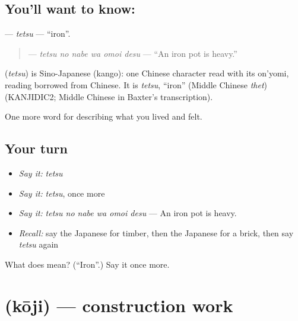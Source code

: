 \subsection*{You'll want to know: }
\textbf{} — \emph{tetsu} — \textquotedblleft{}iron\textquotedblright{}.

\begin{quote}
\textbf{  } — \emph{tetsu no nabe wa omoi desu} — \textquotedblleft{}An iron pot is heavy.\textquotedblright{}
\end{quote}

\begin{cousinweb}
\textbf{} (\emph{tetsu}) is Sino-Japanese (kango): one Chinese character read with its on'yomi, reading borrowed from Chinese. It is \emph{tetsu}, \textquotedblleft{}iron\textquotedblright{} (Middle Chinese \emph{thet}) (KANJIDIC2; Middle Chinese in Baxter's transcription).
\end{cousinweb}

\begin{grammarlens}[title={What you've built}]
One more word for describing what you lived and felt.
\end{grammarlens}

\subsection*{Your turn}
\begin{itemize}
\raggedright
  \item \emph{Say it:} \emph{tetsu}
  \item \emph{Say it:} \emph{tetsu}, once more
  \item \emph{Say it:} \emph{tetsu no nabe wa omoi desu} — An iron pot is heavy.
  \item \emph{Recall:} say the Japanese for timber, then the Japanese for a brick, then say \emph{tetsu} again
\end{itemize}

\begin{tcolorbox}[breakable,colback=teal!4,colframe=teal!35!black,title={Before you move on}]
What does  mean? (\textquotedblleft{}Iron\textquotedblright{}.) Say it once more.
\end{tcolorbox}
\section[\texorpdfstring{\ja{こうじ} (kōji)}{こうじ (kōji)}]{ (kōji) — construction work}

